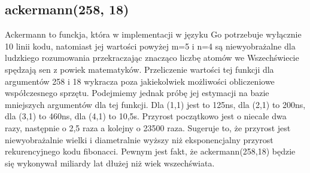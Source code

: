 \documentclass{article}
\begin{document}
\subsection{ackermann(258, 18)}
Ackermann to funckja, która w implementacji w języku Go potrzebuje wyłącznie 10 linii kodu, natomiast jej wartości powyżej m=5 i n=4 są niewyobrażalne dla ludzkiego rozumowania przekraczając znacząco liczbę atomów we Wszechświecie spędzają sen z powiek matematyków. Przeliczenie wartości tej funkcji dla argumentów 258 i 18 wykracza poza jakiekolwiek możliwości obliczeniowe współczesnego sprzętu. Podejmiemy jednak próbę jej estymacji na bazie mniejszych argumentów dla tej funkcji. Dla (1,1) jest to 125ns, dla (2,1) to 200ns, dla (3,1) to 460ns, dla (4,1) to 10,5s. Przyrost początkowo jest o niecałe dwa razy, następnie o 2,5 raza a kolejny o 23500 raza. Sugeruje to, że przyrost jest niewyobrażalnie wielki i diametralnie wyższy niż eksponencjalny przyrost rekurencyjnego kodu fibonacci. Pewnym jest fakt, że ackermann(258,18) będzie się wykonywał miliardy lat dłużej niż wiek wszechświata.
\end{document}
